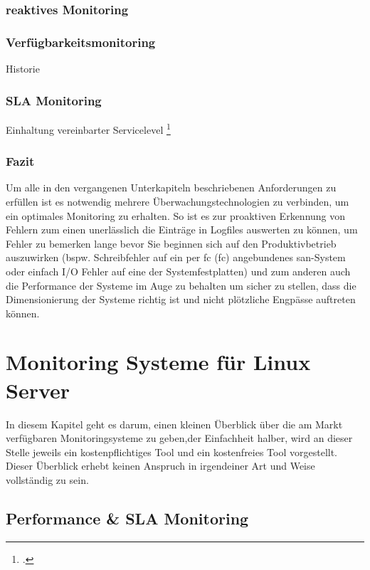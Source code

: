 \documentclass[12pt,a4paper,parskip]{scrreprt}
\begin{document}
	\subsection{reaktives Monitoring}
	\subsection{Verfügbarkeitsmonitoring}
	Historie
	\subsection{SLA Monitoring}
	Einhaltung vereinbarter Servicelevel \footcite[40]{iso20000sla}
	\subsection{Fazit}
	Um alle in den vergangenen Unterkapiteln beschriebenen Anforderungen zu erfüllen ist es notwendig mehrere Überwachungstechnologien zu verbinden, um ein optimales Monitoring zu erhalten. So ist es zur proaktiven Erkennung von Fehlern zum einen unerlässlich die Einträge in Logfiles auswerten zu können, um Fehler zu bemerken lange bevor Sie beginnen sich auf den Produktivbetrieb auszuwirken (bspw. Schreibfehler auf ein per \acrlong{fc} (\acrshort{fc}) angebundenes \gls{san}-System oder einfach I/O Fehler auf eine der Systemfestplatten) und zum anderen auch die Performance der Systeme im Auge zu behalten um sicher zu stellen, dass die Dimensionierung der Systeme richtig ist und nicht plötzliche Engpässe auftreten können.
	\chapter{Monitoring Systeme für Linux Server}
	In diesem Kapitel geht es darum, einen kleinen Überblick über die am Markt verfügbaren Monitoringsysteme zu geben,der Einfachheit halber, wird an dieser Stelle jeweils ein kostenpflichtiges Tool und ein kostenfreies Tool vorgestellt. Dieser Überblick erhebt keinen Anspruch in irgendeiner Art und Weise vollständig zu sein.
	\section{Performance \& SLA Monitoring}
\end{document}
